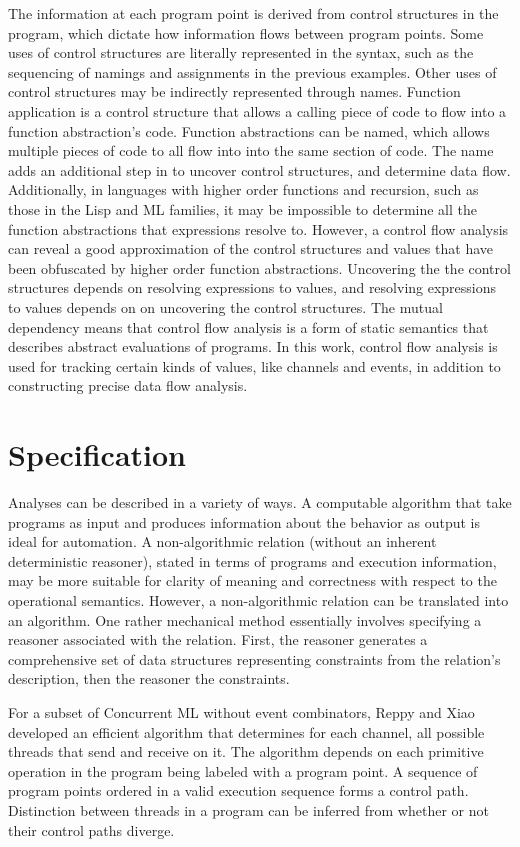 \documentclass{article}
\begin{document}
The information at each program point is derived from control structures in the program, which
dictate how information flows between program points. Some uses of control structures are
literally represented in the syntax, such as the sequencing of namings and assignments in the
previous examples. Other uses of control structures may be indirectly represented through
names. Function application is a control structure that allows a calling piece of code to
flow into a function abstraction's code.  Function abstractions can be named, which allows
multiple pieces of code to all flow into into the same section of code. The name adds an
additional step in to uncover control structures, and determine data flow.
Additionally, in languages with higher order functions and recursion, such as those in the Lisp
and ML families, it may be impossible to determine all the function abstractions that
expressions resolve to. However, a control flow analysis can reveal a good
approximation of the control structures and values that have been obfuscated by higher order
function abstractions.  Uncovering the the control structures depends on resolving expressions
to values, and resolving expressions to values depends on on uncovering the control
structures. The mutual dependency means that control flow analysis is a form of
static semantics that describes abstract evaluations of programs. In this work, control flow
analysis is used for tracking certain kinds of values, like channels and events, in addition to
constructing precise data flow analysis. 

\section{Specification}
Analyses can be described in a variety of ways. A computable algorithm that take programs
as input and produces information about the behavior as output is ideal for automation. A
non-algorithmic relation (without an inherent deterministic reasoner),
stated in terms of programs and execution information, may be
more suitable for clarity of meaning and correctness with respect to the operational
semantics. However, a non-algorithmic relation can be translated into an algorithm.
One rather mechanical method essentially involves
specifying a reasoner associated with the relation. 
First, the reasoner generates a comprehensive set of data structures representing
constraints from the relation's description, then the reasoner the constraints.

For a subset of Concurrent ML without event combinators, Reppy and Xiao developed an
efficient algorithm that determines for each channel, all possible threads that send
and receive on it. The algorithm depends on each primitive operation in the program being
labeled with a program point. A sequence of program points ordered in a valid execution
sequence forms a control path. Distinction between threads in a program can be inferred from
whether or not their control paths diverge.  
\end{document}

